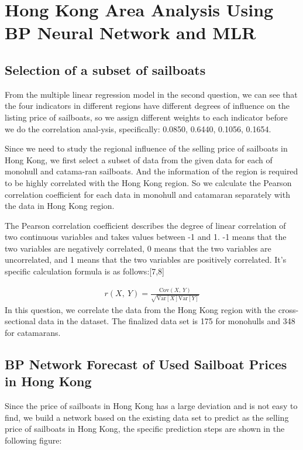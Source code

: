 \section{Hong Kong Area Analysis Using BP Neural Network and MLR}
\subsection{Selection of a subset of sailboats}
From the multiple linear regression model in the second question, we can see that the four indicators in different regions have different degrees of influence on the listing price of sailboats, so we assign different weights to each indicator before we do the correlation anal-ysis, specifically: 0.0850, 0.6440, 0.1056, 0.1654.

Since we need to study the regional influence of the selling price of sailboats in Hong Kong, we first select a subset of data from the given data for each of monohull and catama-ran sailboats. And the information of the region is required to be highly correlated with the Hong Kong region. So we calculate the Pearson correlation coefficient for each data in monohull and catamaran separately with the data in Hong Kong region.

The Pearson correlation coefficient describes the degree of linear correlation of two continuous variables and takes values between -1 and 1. -1 means that the two variables are negatively correlated, 0 means that the two variables are uncorrelated, and 1 means that the two variables are positively correlated. It's specific calculation formula is as follows:[7,8]

\begin{align}
    r\left( X,\ Y \right) =\frac{\text{Cov}\left( X,\ Y \right)}{\sqrt{\text{Var}\left[ X \right] \text{Var}\left[ Y \right]}}
\end{align}
In this question, we correlate the data from the Hong Kong region with the cross-sectional data in the dataset. The finalized data set is 175 for monohulls and 348 for catamarans.

\subsection{BP Network Forecast of Used Sailboat Prices in Hong Kong}
Since the price of sailboats in Hong Kong has a large deviation and is not easy to find, we build a network based on the existing data set to predict as the selling price of sailboats in Hong Kong, the specific prediction steps are shown in the following figure:

